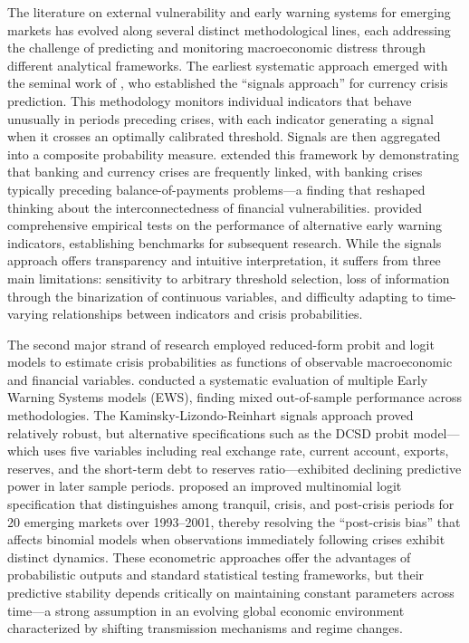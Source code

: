 \documentclass[12pt,a4paper]{article}
\numberwithin{equation}{section}
\theoremstyle{definition}
\theoremstyle{remark}
\begin{document}
The literature on external vulnerability and early warning systems for emerging markets has evolved along several distinct methodological lines, each addressing the challenge of predicting and monitoring macroeconomic distress through different analytical frameworks. The earliest systematic approach emerged with the seminal work of \textcite{kaminsky1998leading}, who established the ``signals approach'' for currency crisis prediction. This methodology monitors individual indicators that behave unusually in periods preceding crises, with each indicator generating a signal when it crosses an optimally calibrated threshold. Signals are then aggregated into a composite probability measure. \textcite{kaminsky1999twin} extended this framework by demonstrating that banking and currency crises are frequently linked, with banking crises typically preceding balance-of-payments problems---a finding that reshaped thinking about the interconnectedness of financial vulnerabilities. \textcite{goldstein2000assessing} provided comprehensive empirical tests on the performance of alternative early warning indicators, establishing benchmarks for subsequent research. While the signals approach offers transparency and intuitive interpretation, it suffers from three main limitations: sensitivity to arbitrary threshold selection, loss of information through the binarization of continuous variables, and difficulty adapting to time-varying relationships between indicators and crisis probabilities.

The second major strand of research employed reduced-form probit and logit models to estimate crisis probabilities as functions of observable macroeconomic and financial variables. \textcite{berg2004assessing} conducted a systematic evaluation of multiple Early Warning Systems models (EWS), finding mixed out-of-sample performance across methodologies. The Kaminsky-Lizondo-Reinhart signals approach proved relatively robust, but alternative specifications such as the DCSD probit model---which uses five variables including real exchange rate, current account, exports, reserves, and the short-term debt to reserves ratio---exhibited declining predictive power in later sample periods. \textcite{bussiere2006towards} proposed an improved multinomial logit specification that distinguishes among tranquil, crisis, and post-crisis periods for 20 emerging markets over 1993--2001, thereby resolving the ``post-crisis bias'' that affects binomial models when observations immediately following crises exhibit distinct dynamics. These econometric approaches offer the advantages of probabilistic outputs and standard statistical testing frameworks, but their predictive stability depends critically on maintaining constant parameters across time---a strong assumption in an evolving global economic environment characterized by shifting transmission mechanisms and regime changes.
\end{document}

